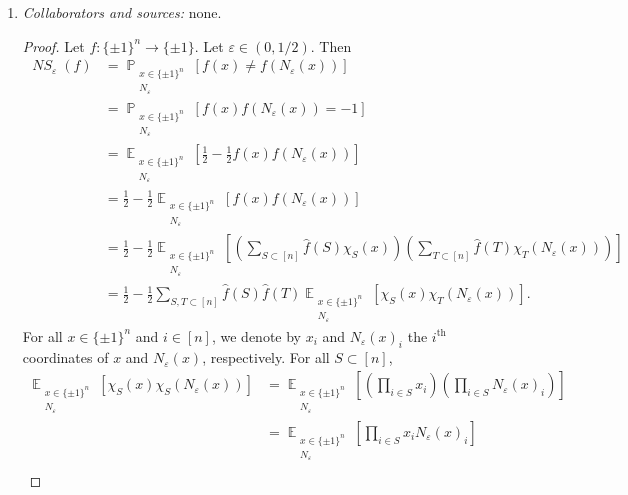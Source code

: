 \documentclass[letterpaper, reqno,11pt]{article}
\newcommand{\PP}{\mathop{{}\mathbb{P}}}
\newcommand{\EE}{\mathop{{}\mathbb{E}}}
\DeclareMathOperator{\NS}{\mathit{NS}}
\begin{document}
\begin{enumerate}
  \item \noindent\emph{Collaborators and sources:} none.
  
  \begin{proof}
    Let $f : \{ \pm 1 \}^n \to \{ \pm 1 \}$. Let $\varepsilon \in (0, 1/2)$. Then
    \begin{align*}
      \NS_\varepsilon(f) &= \PP_{\substack{x \in \{ \pm 1 \}^n \\ N_\varepsilon}} \left[f(x) \neq f\left(N_\varepsilon(x)\right)\right] \\
      &= \PP_{\substack{x \in \{ \pm 1 \}^n \\ N_\varepsilon}} \left[f(x) f\left(N_\varepsilon(x)\right) = -1\right] \\
      &= \EE_{\substack{x \in \{ \pm 1 \}^n \\ N_\varepsilon}}\left[\frac{1}{2} - \frac{1}{2}f(x) f\left(N_\varepsilon(x)\right)\right] \\
      &= \frac{1}{2} - \frac{1}{2} \EE_{\substack{x \in \{ \pm 1 \}^n \\ N_\varepsilon}}\left[f(x) f\left(N_\varepsilon(x)\right)\right] \\
      &= \frac{1}{2} - \frac{1}{2} \EE_{\substack{x \in \{ \pm 1 \}^n \\ N_\varepsilon}}\left[\left(\sum_{S \subset [n]} \hat{f}(S) \chi_S(x)\right) \left(\sum_{T \subset [n]} \hat{f}(T) \chi_T\left(N_\varepsilon(x)\right)\right)\right] \\
      &= \frac{1}{2} - \frac{1}{2} \sum_{S, T \subset [n]} \hat{f}(S) \hat{f}(T) \EE_{\substack{x \in \{ \pm 1 \}^n \\ N_\varepsilon}}\left[\chi_S(x) \chi_T\left(N_\varepsilon(x)\right)\right].
    \end{align*}
    For all $x \in \{ \pm 1 \}^n$ and $i \in [n]$, we denote by $x_i$ and $N_\varepsilon(x)_i$ the $i^\text{th}$ coordinates of $x$ and $N_\varepsilon(x)$, respectively. For all $S \subset [n]$,
    \begin{align}
      \EE_{\substack{x \in \{ \pm 1 \}^n \\ N_\varepsilon}}\left[\chi_S(x) \chi_S\left(N_\varepsilon(x)\right)\right] &= \EE_{\substack{x \in \{ \pm 1 \}^n \\ N_\varepsilon}} \left[\left(\prod_{i \in S} x_i\right)\left(\prod_{i \in S} N_\varepsilon(x)_i\right)\right] \nonumber \\
      &= \EE_{\substack{x \in \{ \pm 1 \}^n \\ N_\varepsilon}}\left[\prod_{i \in S} x_i N_\varepsilon(x)_i\right] \nonumber \\

\end{align}
\end{proof}
\end{enumerate}
\end{document}

